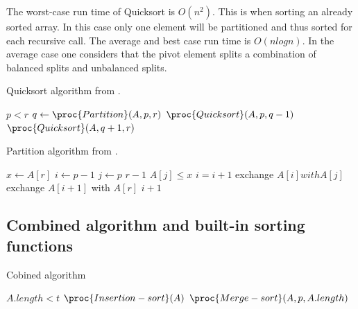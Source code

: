 \documentclass[sigconf, nonacm, natbib, screen, balance=False]{acmart}
\begin{document}
The worst-case run time of Quicksort is $O(n^2)$. This is when sorting an already sorted array. In this case only one element will be partitioned and thus sorted for each recursive call. The average and best case run time is $O(nlogn)$. In the average case one considers that the pivot element splits a combination of balanced splits and unbalanced splits. \cite[p. 174-176]{CLRS_2009}

\FloatBarrier
\begin{listing}
  \caption{Quicksort algorithm from \citet[Ch.~7.1. p 171 ]{CLRS_2009}.}
  \label{lst:quicksort-algo}
  
\begin{codebox}
\li \If $p < r$
\li \Then
$q \gets \proc{Partition}(A, p, r)$
\li $\proc{Quicksort}(A, p, q-1)$
\li $\proc{Quicksort}(A, q + 1, r)$
\End
\end{codebox}
\end{listing}

\begin{listing}
  \caption{Partition algorithm from \citet[Ch.~7.1. p 171 ]{CLRS_2009}.}
  \label{lst:partition_algo}

\begin{codebox}
    \li $x \gets A[r]$
    \li $i \gets p - 1$
    \li \For $j \gets p$ \To $r-1$
    \li \Do
    \If $A[j] \leq x$
    \li \Do
    $i = i + 1$
    \li exchange $A[i] with A[j]$
    \End
    \End
    \li exchange $A[i + 1]$ with $A[r]$
    \li \Return $i + 1$
    \End
\end{codebox}

\end{listing}
\FloatBarrier

\subsection{Combined algorithm and built-in sorting functions}



\begin{listing}
  \caption{Cobined algorithm}
  \label{lst:cobined_algo}
\begin{codebox}
\li \If $A.length < t$
\li \Then $\proc{Insertion-sort}(A)$
\li \Else $\proc{Merge-sort}(A, p, A.length)$
\End
\end{codebox}
\end{listing}
\end{document}
